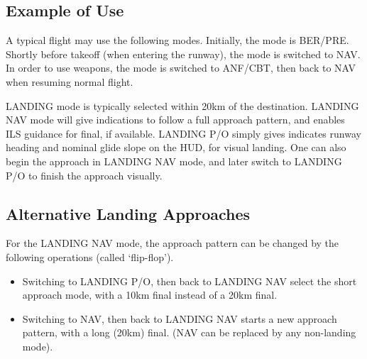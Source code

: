 \documentclass[a4paper]{report}
\begin{document}
{\subsection{Example of Use}
A typical flight may use the following modes.
Initially, the mode is BER/PRE.
Shortly before takeoff (when entering the runway), the mode is switched to NAV.
In order to use weapons, the mode is switched to ANF/CBT,
then back to NAV when resuming normal flight.

LANDING mode is typically selected within 20km of the destination.
LANDING NAV mode will give indications to follow a full approach pattern,
and enables ILS guidance for final, if available.
LANDING P/O simply gives indicates runway heading and nominal glide slope on the HUD, for visual landing.
One can also begin the approach in LANDING NAV mode,
and later switch to LANDING P/O to finish the approach visually.

\subsection{Alternative Landing Approaches}
For the LANDING NAV mode, the approach pattern can be changed
by the following operations (called `flip-flop').
\begin{itemize}
  \item Switching to LANDING P/O, then back to LANDING NAV select the short approach mode,
    with a 10km final instead of a 20km final.
  \item Switching to NAV, then back to LANDING NAV
    starts a new approach pattern, with a long (20km) final.
    (NAV can be replaced by any non-landing mode).
\end{itemize}
}
\end{document}

